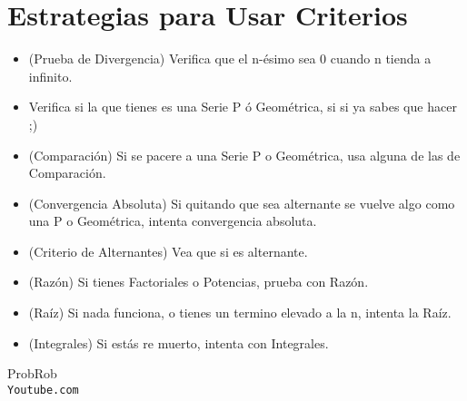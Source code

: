 \documentclass[12pt]{report}                                %
\begin{document}
    \clearpage
    \section{Estrategias para Usar Criterios}

    \begin{itemize}
        \item (Prueba de Divergencia) Verifica que el n-ésimo sea 0 cuando n tienda a infinito.
        \item Verifica si la que tienes es una Serie P ó Geométrica, si si ya sabes que hacer ;)
        \item (Comparación) Si se pacere a una Serie P o Geométrica, usa alguna de las de Comparación.
        \item (Convergencia Absoluta) Si quitando que sea alternante se vuelve algo como una P o Geométrica, intenta convergencia absoluta.
        \item (Criterio de Alternantes) Vea que si es alternante.
        \item (Razón) Si tienes Factoriales o Potencias, prueba con Razón.
        \item (Raíz) Si nada funciona, o tienes un termino elevado a la n, intenta la Raíz.
        \item (Integrales) Si estás re muerto, intenta con Integrales.
    \end{itemize}



\clearpage

    \begin{thebibliography}{9}

        ProbRob
        \\\texttt{Youtube.com}


     

\end{thebibliography}
\end{document}
